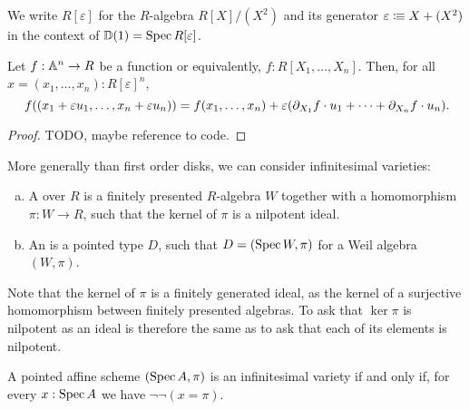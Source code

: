\begin{definition}
  We write $R[\varepsilon]$ for the $R$-algebra $R[X]/(X^2)$ and its generator $\varepsilon\vcentcolon\mspace{-1.2mu}\equiv X+(X^2)$
  in the context of $\mathbb{D}(1)=\operatorname{Spec} R[\varepsilon]$.
\end{definition}

\begin{lemma}%
  \label{evaluate-on-first-order-disk}
  Let $f:\mathbb{A}^n\to R$ be a function or equivalently, $f:R[X_1,\dots,X_n]$.
  Then, for all $x=(x_1,\dots,x_n):R[\varepsilon]^n$,
  \[
    f((x_1+\varepsilon u_1, \dots , x_n+\varepsilon u_n))=f(x_1,\dots,x_n)+\varepsilon(\partial_{X_1}f\cdot u_1+\dots+\partial_{X_n}f\cdot u_n)
    \rlap{.}
  \]
\end{lemma}

\begin{proof}
  TODO, maybe reference to code.
\end{proof}

More generally than first order disks, we can consider infinitesimal varieties:

\begin{definition}
  \begin{enumerate}[(a)]
  \item A  over $R$ is a finitely presented $R$-algebra
    $W$ together with a homomorphism $\pi : W \to R$, such that the kernel of $\pi$ is a nilpotent ideal.
  \item An  is a pointed type $D$,
    such that $D = (\operatorname{Spec} W, \pi)$ for a Weil algebra $(W, \pi)$.
  \end{enumerate}
\end{definition}

Note that the kernel of $\pi$ is a finitely generated ideal,
as the kernel of a surjective homomorphism between finitely presented algebras.
To ask that $\ker \pi$ is nilpotent as an ideal
is therefore the same as to ask that each of its elements is nilpotent.

\begin{lemma}%
  \label{characterization-infinitesimal-variety}
  A pointed affine scheme $(\operatorname{Spec} A, \pi)$
  is an infinitesimal variety
  if and only if,
  for every $x : \operatorname{Spec} A$ we have $\lnot \lnot (x = \pi)$.
\end{lemma}

